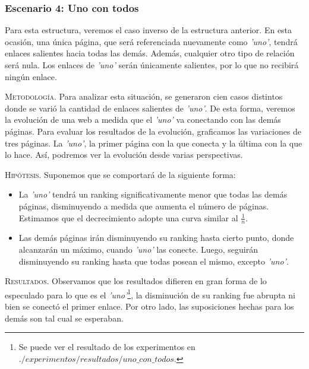 \vspace{2em}
\subsubsection{Escenario 4: Uno con todos} Para esta estructura, veremos el caso inverso de la estructura anterior. En esta ocasión, una única página, que será referenciada nuevamente como \textit{'uno'}, tendrá enlaces salientes hacia todas las demás. Además, cualquier otro tipo de relación será nula. Los enlaces de \textit{'uno'} serán únicamente salientes, por lo que no recibirá ningún enlace.

\vspace{1em}

\vspace{1em}
\noindent \textsc{Metodología}. Para analizar esta situación, se generaron cien casos distintos donde se varió la cantidad de enlaces salientes de \textit{'uno'}. De esta forma, veremos la evolución de una web a medida que el \textit{'uno'} va conectando con las demás páginas. Para evaluar los resultados de la evolución, graficamos las variaciones de tres páginas. La \textit{'uno'}, la primer página con la que conecta y la última con la que lo hace. Así, podremos ver la evolución desde varias perspectivas.

\vspace{1em}
\noindent \textsc{Hipótesis}. Suponemos que se comportará de la siguiente forma:
\begin{itemize}
\item La \textit{'uno'} tendrá un ranking significativamente menor que todas las demás páginas, disminuyendo a medida que aumenta el número de páginas. Estimamos que el decrecimiento adopte una curva similar al $\frac{1}{n}$.
\item Las demás páginas irán disminuyendo su ranking hasta cierto punto, donde alcanzarán un máximo, cuando \textit{'uno'} las conecte. Luego, seguirán disminuyendo su ranking hasta que todas posean el mismo, excepto \textit{'uno'}.
\end{itemize}

\vspace{1em}
\noindent \textsc{Resultados}. Observamos que los resultados difieren en gran forma de lo especulado para lo que es el \textit{'uno'}\footnote{Se puede ver el resultado de los experimentos en $./experimentos/resultados/uno\_con\_todos$.}, la disminución de su ranking fue abrupta ni bien se conectó el primer enlace. Por otro lado, las suposiciones hechas para los demás son tal cual se esperaban.




